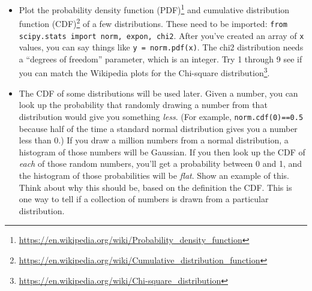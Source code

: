 \documentclass[11pt]{hmcpset}
\begin{document}
\begin{problem}
\begin{itemize}
		\item Plot the probability density function (PDF)\footnote{\url{https://en.wikipedia.org/wiki/Probability_density_function}} and cumulative distribution function (CDF)\footnote{\url{https://en.wikipedia.org/wiki/Cumulative_distribution_function}} of a few distributions. These need to be imported: \texttt{from scipy.stats import norm, expon, chi2}. After you've created an array of \texttt{x} values, you can say things like \texttt{y = norm.pdf(x)}. The chi2 distribution needs a ``degrees of freedom'' parameter, which is an integer. Try 1 through 9 see if you can match the Wikipedia plots for the Chi-square distribution\footnote{\url{https://en.wikipedia.org/wiki/Chi-square_distribution}}.
		\item The CDF of some distributions will be used later. Given a number, you can look up the probability that randomly drawing a number from that distribution would give you something \textit{less}. (For example, \texttt{norm.cdf(0)==0.5} because half of the time a standard normal distribution gives you a number less than 0.) If you draw a million numbers from a normal distribution, a histogram of those numbers will be Gaussian. If you then look up the CDF of \textit{each} of those random numbers, you'll get a probability between 0 and 1, and the histogram of those probabilities will be \textit{flat}. Show an example of this. Think about why this should be, based on the definition the CDF. This is one way to tell if a collection of numbers is drawn from a particular distribution.
	\end{itemize}
\end{problem}
\end{document}
